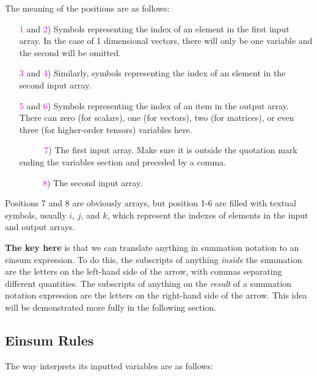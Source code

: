 The meaning of the positions are as follows:

\begin{enumerate}
\item[\textcolor{magenta}{1} and \textcolor{magenta}{2})] Symbols representing the index of an element in the first input array. In the case of 1 dimensional vectors, there will only be one variable and the second will be omitted.
\item[\textcolor{magenta}{3} and \textcolor{magenta}{4})] Similarly, symbols representing the index of an element in the second input array.
\item[\textcolor{magenta}{5} and \textcolor{magenta}{6})] Symbols representing the index of an item in the output array. There can zero (for scalars), one (for vectors), two (for matrices), or even three (for higher-order tensors) variables here.
\item[\textcolor{white}{easter} \textcolor{magenta}{7})] The first input array. Make sure it is outside the quotation mark ending the variables section and preceded by a comma.
\item[\textcolor{white}{e g g!} \textcolor{magenta}{8})] The second input array.
\end{enumerate}

Positions 7 and 8 are obviously arrays, but position 1-6 are filled with textual symbols, usually $i$, $j$, and $k$, which represent the indexes of elements in the input and output arrays. 

\textbf{The key here} is that we can translate anything in summation notation to an einsum expression.
To do this, the subscripts of anything \emph{inside} the summation are the letters on the left-hand side of the arrow, with commas separating different quantities. 
The subscripts of anything on the \emph{result} of a summation notation expression are the letters on the right-hand side of the arrow.
This idea will be demonstrated more fully in the following section.

\subsection*{Einsum Rules}

The way  interprets its inputted variables are as follows:

